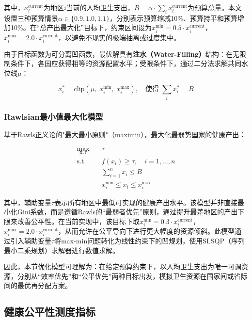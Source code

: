 \documentclass[12pt,a4paper]{ctexart}
\begin{document}
其中，$x_i^{\text{current}}$为地区$i$当前的人均卫生支出，$B = \alpha \cdot \sum_i x_i^{\text{current}}$为预算总量。本文设置三种预算情景$\alpha \in \{0.9, 1.0, 1.1\}$，分别表示预算缩减10\%、预算持平和预算增加10\%。在“总产出最大化”目标下，约束区间设为$x_i^{\text{min}} = 0.5 \cdot x_i^{\text{current}}$，$x_i^{\text{max}} = 2.0 \cdot x_i^{\text{current}}$，以避免不现实的极端抽离或过度集中。

由于目标函数为可分离凹函数，最优解具有\textbf{注水（Water-Filling）}结构：在无限制条件下，各国应获得相等的资源配置水平；受限条件下，通过二分法求解共同水位线$\mu$：

\begin{equation}
    x_i^* = \text{clip}(\mu, \; x_i^{\text{min}}, \; x_i^{\text{max}}), \quad \text{使得} \; \sum_i x_i^* = B
\end{equation}

\subsubsection{Rawlsian最小值最大化模型}

基于Rawls正义论的"最大最小原则"（maximin），最大化最弱势国家的健康产出：

\begin{equation}
\label{eq:maximin}
\begin{aligned}
\max_{\mathbf{x}, \tau} \quad & \tau \\
\text{s.t.} \quad & f(x_i) \geq \tau, \quad i = 1, \ldots, n \\
& \sum_{i=1}^{n} x_i \leq B \\
& x_i^{\text{min}} \leq x_i \leq x_i^{\text{max}}
\end{aligned}
\end{equation}

其中，辅助变量$\tau$表示所有地区中最低可实现的健康产出水平。该模型并非直接最小化Gini系数，而是遵循Rawls的“最弱者优先”原则，通过提升最差地区的产出下限来改善公平性。在当前实现中，该目标下取$x_i^{\text{min}} = 0.3 \cdot x_i^{\text{current}}$，$x_i^{\text{max}} = 2.0 \cdot x_i^{\text{current}}$，从而允许在公平导向下进行更大幅度的资源倾斜。此模型通过引入辅助变量$\tau$将max-min问题转化为线性约束下的凹规划，使用SLSQP（序列最小二乘规划）求解器进行数值求解。

因此，本节优化模型可理解为：在给定预算约束下，以人均卫生支出为唯一可调资源，分别从“效率优先”和“公平优先”两种目标出发，模拟卫生资源在国家间或省际间的最优再分配方案。

\subsection{健康公平性测度指标}
\end{document}
